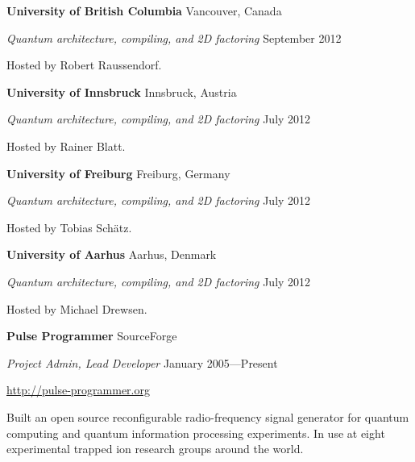 \documentclass[letter]{article}
\begin{document}
\vspace{\baselineskip}
\newpage

\vspace{\baselineskip}
\par
{\bf {University of British Columbia}} \hfill Vancouver, Canada
\par
{\em Quantum architecture, compiling, and 2D factoring} \hfill September 2012
\par
Hosted by Robert Raussendorf.

\vspace{\baselineskip}
\par
{\bf {University of Innsbruck}} \hfill Innsbruck, Austria
\par
{\em Quantum architecture, compiling, and 2D factoring} \hfill July 2012
\par
Hosted by Rainer Blatt.

\vspace{\baselineskip}
\par
{\bf {University of Freiburg}} \hfill Freiburg, Germany
\par
{\em Quantum architecture, compiling, and 2D factoring} \hfill July 2012
\par
Hosted by Tobias Sch\"atz.

\vspace{\baselineskip}
\par
{\bf {University of Aarhus}} \hfill Aarhus, Denmark
\par
{\em Quantum architecture, compiling, and 2D factoring} \hfill July 2012
\par
Hosted by Michael Drewsen.

\vspace{\baselineskip}
\par
{\bf {Pulse Programmer}} \hfill SourceForge
\par
{\em Project Admin, Lead Developer} \hfill January 2005---Present
\par
\url{http://pulse-programmer.org}
\par
Built an open source reconfigurable radio-frequency signal generator
for quantum computing and quantum information processing experiments.
In use at eight experimental trapped ion research groups around the world.
\end{document}
